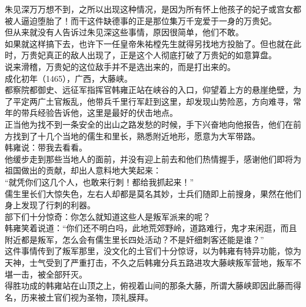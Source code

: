 \begin{multicols}{\theparacolNo}
朱见深万万想不到，之所以出现这种情况，是因为所有怀上他孩子的妃子或宫女都被人逼迫堕胎了！而干这件缺德事的正是那位集万千宠爱于一身的万贵妃。\\

但从来就没有人告诉过朱见深这些事情，原因很简单，他们不敢。\\

如果就这样搞下去，也许下一任皇帝朱祐樘先生就得另找地方投胎了。但也就在此时，万贵妃真正的敌人出现了，正是这个人彻底打破了万贵妃的如意算盘。\\

说来滑稽，万贵妃的这位敌手并不是选出来的，而是打出来的。\\

成化初年（1465），广西，大藤峡。\\

都察院都御史、远征军指挥官韩雍正站在峡谷的入口，仰望着上方的悬崖绝壁，为了平定两广土官叛乱，他带兵千里行军赶到这里，却发现山势险恶，方向难寻，常年的带兵经验告诉他，这里是最好的伏击地点。\\

正当他为找不到一条安全的出山之路发愁的时候，手下兴奋地向他报告，他们在前方找到了十几个当地的儒生和里长，熟悉附近地形，愿意为大军带路。\\

韩雍说：带我去看看。\\

他缓步走到那些当地人的面前，并没有迎上前去和他们热情握手，感谢他们即将为祖国做出的贡献，却出人意料地大笑起来：\\

“就凭你们这几个人，也敢来行刺！都给我抓起来！”\\

儒生里长们大惊失色，左右人却都是莫名其妙，士兵们随即上前搜身，果然在他们身上发现了行刺的利器。\\

部下们十分惊奇：你怎么就知道这些人是叛军派来的呢？\\

韩雍笑着说道：“你们还不明白吗，此地荒郊野岭，道路难行，鬼才来闲逛，而且附近都是叛军，怎么会有儒生里长四处活动？不是奸细刺客还能是谁？”\\

这件事情传到了叛军那里，没文化的土官们十分惊讶，以为韩雍有特异功能，惊为天神，士气受到了严重打击，不久之后韩雍分兵五路进攻大藤峡叛军营地，叛军不堪一击，被全部歼灭。\\

得胜功成的韩雍站在山顶之上，俯视着山间的那条大藤，所谓大藤峡即因此藤而得名，历来被土官们视为圣物，顶礼膜拜。\\


\end{multicols}
